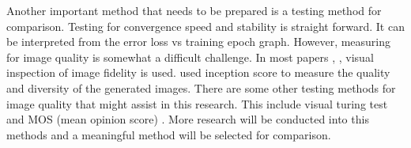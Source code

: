 \documentclass[../main/main.tex]{subfiles}
\begin{document}
	Another important method that needs to be prepared is a testing method for comparison. Testing for convergence speed and stability is straight forward. It can be interpreted from the error loss vs training epoch graph. However, measuring for image quality is somewhat a difficult challenge. In most papers , ,  visual inspection of image fidelity is used.  used inception score to measure the quality and diversity of the generated images. There are some other testing methods for image quality that might assist in this research. This include visual turing test  and \gls{MOS} (mean opinion score) . More research will be conducted  into this methods and a meaningful method will be selected for comparison.
\end{document}
